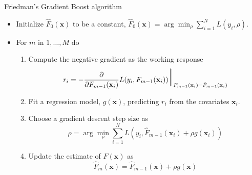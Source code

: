 \documentclass{beamer}
\begin{document}
                     \begin{frame}{Friedman's Gradient Boost algorithm}
                     \begin{itemize}
\item Initialize $\hat F_0(\mathbf{x})$ to be a constant, $\hat F_0(\mathbf{x}) = \arg \min_{\rho} \sum_{i=1}^N L(y_i,\rho)$. \\
\item For $m$ in $1,\ldots,M$ do
\begin{enumerate}
\item Compute the negative gradient as the working response
    \begin{equation}
    r_i = -\frac{\partial}{\partial F_{m-1}(\mathbf{x}_i)} L(y_i,F_{m-1}(\mathbf{x}_i)) \mbox{\Huge $|$}_{F_{m-1}(\mathbf{x}_i)=\hat F_{m-1}(\mathbf{x}_i)}
    \end{equation}
\item Fit a regression model, $g(\mathbf{x})$, predicting $r_i$ from the covariates $\mathbf{x}_i$. \item Choose a gradient descent step size as
    \begin{equation}
    \rho = \arg \min_{\rho} \sum_{i=1}^N L(y_i,\hat F_{m-1}(\mathbf{x}_i)+\rho g(\mathbf{x}_i))
    \end{equation}
\item Update the estimate of $F(\mathbf{x})$ as
    \begin{equation}
    \hat F_m(\mathbf{x}) = \hat F_{m-1}(\mathbf{x}) + \rho g(\mathbf{x})
    \end{equation}
\end{enumerate} 
\end{itemize}
                     \end{frame}
                         
\end{document}

